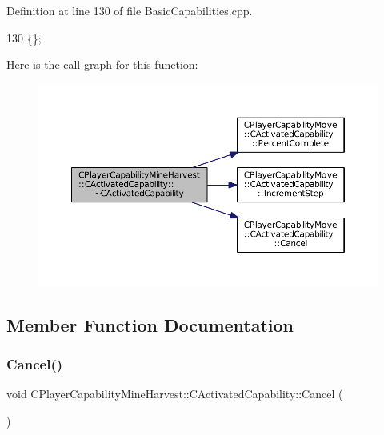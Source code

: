 Definition at line 130 of file Basic\+Capabilities.\+cpp.


\begin{DoxyCode}
130 \{\};
\end{DoxyCode}
Here is the call graph for this function\+:
\nopagebreak
\begin{figure}[H]
\begin{center}
\leavevmode
\includegraphics[width=350pt]{classCPlayerCapabilityMineHarvest_1_1CActivatedCapability_a206562e670341a6eb24d0c5dc1bea976_cgraph}
\end{center}
\end{figure}


\subsection{Member Function Documentation}
\hypertarget{classCPlayerCapabilityMineHarvest_1_1CActivatedCapability_ab1fef064fbc085a6419b5a822e787614}{}\label{classCPlayerCapabilityMineHarvest_1_1CActivatedCapability_ab1fef064fbc085a6419b5a822e787614} 
\subsubsection{\texorpdfstring{Cancel()}{Cancel()}}
{\footnotesize\ttfamily void C\+Player\+Capability\+Mine\+Harvest\+::\+C\+Activated\+Capability\+::\+Cancel (\begin{DoxyParamCaption}{ }\end{DoxyParamCaption})\hspace{0.3cm}{\ttfamily [virtual]}}



